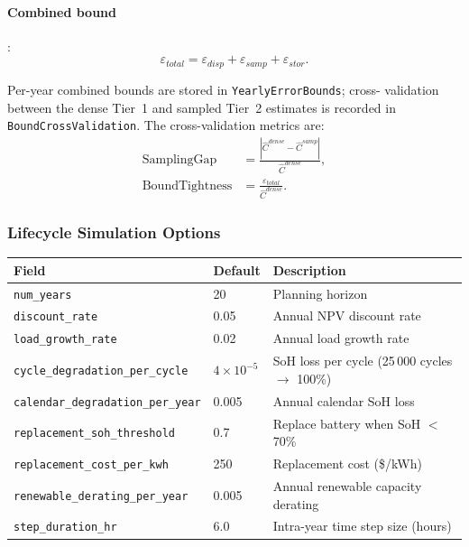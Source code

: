 \paragraph{Combined bound}:
\begin{equation}
  \varepsilon_{total} = \varepsilon_{disp} + \varepsilon_{samp} + \varepsilon_{stor}.
  \label{eq:bound-total}
\end{equation}

Per-year combined bounds are stored in \texttt{YearlyErrorBounds}; cross-
validation between the dense Tier~1 and sampled Tier~2 estimates is
recorded in \texttt{BoundCrossValidation}.  The cross-validation metrics are:
\begin{align}
  \text{SamplingGap}    &= \frac{|\hat{C}^{dense} - \hat{C}^{samp}|}
                            {\hat{C}^{dense}}, \\
  \text{BoundTightness} &= \frac{\varepsilon_{total}}{\hat{C}^{dense}}.
\end{align}

\subsubsection{Lifecycle Simulation Options}

\begin{center}
\begin{tabular}{lll}
\hline\hline
\textbf{Field} & \textbf{Default} & \textbf{Description} \\
\hline
\texttt{num\_years} & 20 & Planning horizon \\
\texttt{discount\_rate} & 0.05 & Annual NPV discount rate \\
\texttt{load\_growth\_rate} & 0.02 & Annual load growth rate \\
\texttt{cycle\_degradation\_per\_cycle} & $4\times10^{-5}$ & SoH loss per cycle (25\,000 cycles $\to$ 100\%) \\
\texttt{calendar\_degradation\_per\_year} & 0.005 & Annual calendar SoH loss \\
\texttt{replacement\_soh\_threshold} & 0.7 & Replace battery when SoH $<$ 70\% \\
\texttt{replacement\_cost\_per\_kwh} & 250 & Replacement cost (\$/kWh) \\
\texttt{renewable\_derating\_per\_year} & 0.005 & Annual renewable capacity derating \\
\texttt{step\_duration\_hr} & 6.0 & Intra-year time step size (hours) \\
\hline\hline
\end{tabular}
\end{center}

